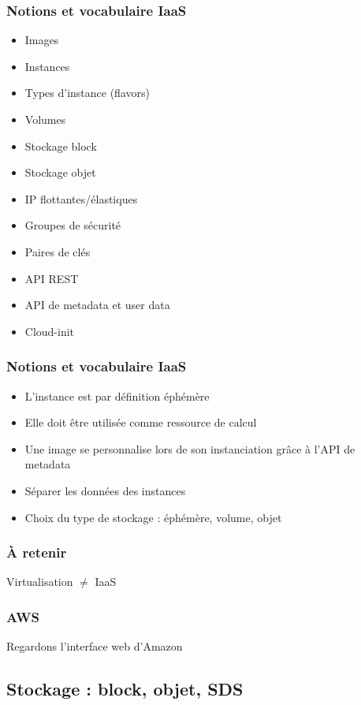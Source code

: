   \begin{frame}
    \frametitle{Notions et vocabulaire IaaS}
    \begin{itemize}
      \item Images
      \item Instances
      \item Types d'instance (flavors)
      \item Volumes\pause
      \item Stockage block
      \item Stockage objet\pause
      \item IP flottantes/élastiques\pause
      \item Groupes de sécurité\pause
      \item Paires de clés\pause
      \item API REST\pause
      \item API de metadata et user data
      \item Cloud-init
    \end{itemize}
  \end{frame}

  \begin{frame}
    \frametitle{Notions et vocabulaire IaaS}
    \begin{itemize}
      \item L'instance est par définition éphémère
      \item Elle doit être utilisée comme ressource de calcul
      \item Une image se personnalise lors de son instanciation grâce à l'API de metadata
      \item Séparer les données des instances
      \item Choix du type de stockage : éphémère, volume, objet
    \end{itemize}
  \end{frame}

  \begin{frame}
    \frametitle{À retenir}
    \Huge{Virtualisation $\ne$ IaaS}
  \end{frame}

  \begin{frame}
    \frametitle{AWS}
    \huge{Regardons l'interface web d'Amazon}
  \end{frame}

  \subsection[Stockage]{Stockage : block, objet, SDS}

